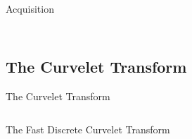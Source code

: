 \documentclass[mathserif]{beamer}
\begin{document}
\begin{frame}{Acquisition}
\begin{columns}[T]
\begin{column}{0.5\textwidth}
{            }
        \end{column}
    \end{columns}
\end{frame}

\subsection{The Curvelet Transform}
\begin{frame}{The Curvelet Transform}
    \begin{columns}
        \begin{column}{.5\textwidth}
            
        \end{column}
        \begin{column}{.5\textwidth}
            
        \end{column}
    \end{columns}
\end{frame}

\begin{frame}{The Fast Discrete Curvelet Transform}
    \begin{columns}
        \begin{column}{.5\textwidth}
            
        \end{column}
    \end{columns}
\end{frame}
\end{document}

